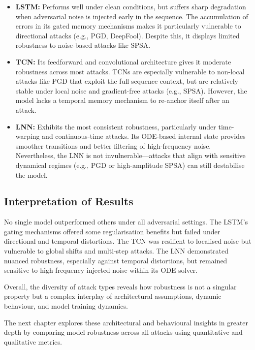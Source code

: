 \begin{itemize}
    \item \textbf{LSTM:} Performs well under clean conditions, but suffers sharp degradation when adversarial noise is injected early in the sequence. The accumulation of errors in its gated memory mechanisms makes it particularly vulnerable to directional attacks (e.g., PGD, DeepFool). Despite this, it displays limited robustness to noise-based attacks like SPSA.
    
    \item \textbf{TCN:} Its feedforward and convolutional architecture gives it moderate robustness across most attacks. TCNs are especially vulnerable to non-local attacks like PGD that exploit the full sequence context, but are relatively stable under local noise and gradient-free attacks (e.g., SPSA). However, the model lacks a temporal memory mechanism to re-anchor itself after an attack.

    \item \textbf{LNN:} Exhibits the most consistent robustness, particularly under time-warping and continuous-time attacks. Its ODE-based internal state provides smoother transitions and better filtering of high-frequency noise. Nevertheless, the LNN is not invulnerable—attacks that align with sensitive dynamical regimes (e.g., PGD or high-amplitude SPSA) can still destabilise the model.
\end{itemize}

\subsection*{Interpretation of Results}
No single model outperformed others under all adversarial settings. The LSTM's gating mechanisms offered some regularisation benefits but failed under directional and temporal distortions. The TCN was resilient to localised noise but vulnerable to global shifts and multi-step attacks. The LNN demonstrated nuanced robustness, especially against temporal distortions, but remained sensitive to high-frequency injected noise within its ODE solver.

Overall, the diversity of attack types reveals how robustness is not a singular property but a complex interplay of architectural assumptions, dynamic behaviour, and model training dynamics.

\vspace{1em}
\noindent The next chapter explores these architectural and behavioural insights in greater depth by comparing model robustness across all attacks using quantitative and qualitative metrics.


